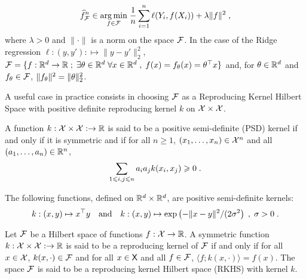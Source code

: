 \begin{equation}
\label{eq:erm:rkhs}
\widehat f^n_{\calF} \in \underset{f\in\calF}{\argmin}\; \frac{1}{n}\sum_{i=1}^n \ell(Y_i,f(X_i)) + \lambda\|f\|^2\eqsp,
\end{equation}
where $\lambda>0$ and $\|\cdot\|$ is a norm on the space $\mathcal{F}$.  In the case of the Ridge regression $\ell:(y,y'): \mapsto \|y-y'\|_2^2$, $\mathcal{F} = \{f: \mathbb{R}^d\to\mathbb{R}\;;\; \exists \theta\in\mathbb{R}^d \;\forall x\in \mathbb{R}^d\;, \; f(x) =f_\theta(x)= \theta^\top x\}$ and, for $\theta\in\mathbb{R}^d$ and $f_\theta\in\mathcal{F}$,  $\|f_\theta\|^2 = \|\theta\|_2^2$.

A useful case in practice consists in choosing $\mathcal{F}$ as a Reproducing Kernel Hilbert Space with positive definite reproducing kernel $k$ on $\mathcal{X}\times \mathcal{X}$.

\begin{shaded}
\begin{definition}
\label{def:kernel}
A function $k:\mathcal{X}\times\mathcal{X}:\to \mathbb{R}$ is said to be a positive semi-definite (PSD) kernel if and only if it is symmetric and if for all $n\geqslant 1$, $(x_1,\ldots,x_n)\in\mathcal{X}^n$ and all $(a_1,\ldots,a_n)\in\mathbb{R}^n$,
\[
\sum_{1\leqslant i,j\leqslant n}a_ia_jk(x_i,x_j) \geqslant 0\;.
\]
\end{definition}
\end{shaded}

\begin{remark}
The following functions, defined on $\mathbb{R}^d\times\mathbb{R}^d$, are positive semi-definite kernels:
$$
k:(x,y)\mapsto x^\top y \quad\mathrm{and}\quad k:(x,y)\mapsto \mathrm{exp}\left(-\|x-y\|^2/(2\sigma^2\right)\;,\; \sigma>0\;.
$$
\end{remark}

\begin{shaded}
\begin{definition}
Let $\mathcal{F}$ be a Hilbert space of functions $f:\mathcal{X}\to\mathbb{R}$. A symmetric function $k:\mathcal{X}\times\mathcal{X}:\to \mathbb{R}$ is said to be a reproducing kernel of $\mathcal{F}$ if and only if for all $x\in\mathcal{X}$, $k(x,\cdot)\in\mathcal{F}$ and for all $x\in\mathsf{X}$ and all $f\in\mathcal{F}$, $\langle f; k(x,\cdot)\rangle = f(x)$. The space $\mathcal{F}$ is said to be a reproducing kernel Hilbert space (RKHS) with kernel $k$.
\end{definition}
\end{shaded}

